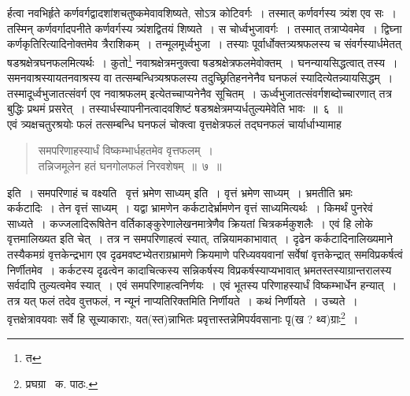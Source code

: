 \documentclass[11pt, openany]{book}
\begin{document}
\noindent र्हत्वा नवभिर्हृते कर्णवर्गद्वादशांशचतुष्कमेवावशिष्यते, सोऽत्र कोटिवर्गः~। तस्मात् कर्णवर्गस्य त्र्यंश एव सः~। तस्मिन् कर्णवर्गादपनीते कर्णवर्गस्य त्र्यंशद्वितयं शिष्यते~। स चोर्ध्वभुजावर्गः~। तस्मात् तत्राप्येवमेव~। द्विघ्ना कर्णकृतिरित्यादिनोक्तमेव त्रैराशिकम्~। तन्मूलमूर्ध्वभुजा~। तस्याः पूर्वार्धोक्तत्र्यश्रफलस्य च संवर्गस्यार्धमेतत् षडश्रक्षेत्रघनफलमित्यर्थः~। कुतो\renewcommand{\thefootnote}{१}\footnote{त} 
नवाश्रक्षेत्रमनुक्त्वा षडश्रक्षेत्रफलमेवोक्तम्~। घनन्यायसिद्धत्वात् तस्य~। समनवाश्रस्यायतनवाश्रस्य वा तत्सम्बन्धित्र्यश्रफलस्य तदुच्छ्रितिहननेनैव घनफलं स्यादित्येतन्न्यायसिद्धम्~। तस्मादूर्ध्वभुजातत्संवर्ग एव नवाश्रफलम् इत्येतच्चाप्यनेनैव सूचितम्~। ऊर्ध्वभुजातत्संवर्गशब्दोच्चारणात् तत्र बुद्धिः प्रथमं प्रसरेत्~। तस्यार्धस्यापनीनत्वादवशिष्टं षडश्रक्षेत्रमप्यर्धतुल्यमेवेति भावः~॥~६~॥ \\

एवं त्र्यक्षचतुरश्रयोः फलं तत्सम्बन्धि घनफलं चोक्त्वा वृत्तक्षेत्रफलं तद्घनफलं चार्यार्धाभ्यामाह\textendash 

\begin{quote}
{\ab समपरिणाहस्यार्धं विष्कम्भार्धहतमेव वृत्तफलम्~।\\
तन्निजमूलेन हतं घनगोलफलं निरवशेषम्~॥~७~॥}
\end{quote}

इति~। समपरिणाहं च वक्ष्यति \textendash\ {\qt वृत्तं भ्रमेण साध्यम्} इति~। वृत्तं भ्रमेण साध्यम्~। भ्रमतीति भ्रमः कर्कटादिः~। तेन वृत्तं साध्यम्~। यद्वा भ्रामणेन कर्कटादेर्भ्रामणेन वृत्तं साध्यमित्यर्थः~। किमर्थं पुनरेवं साध्यते~। कज्जलादिरूषितेन वर्तिकाङ्कुरेणालेखनमात्रेणैव क्रियतां चित्रकर्मकुशलैः~। एवं हि लोके वृत्तमालिख्यत इति चेत्~। तत्र न समपरिणाहत्वं स्यात्, तन्नियामकाभावात्~। दृढेन कर्कटादिनालिख्यमाने तस्यैकमग्रं वृत्तकेन्द्रभाग एव दृढमवष्टभ्येतराग्रभ्रामणे क्रियमाणे परिध्यवयवानां
सर्वेषां वृत्तकेन्द्रात् समविप्रकर्षत्वं निर्णीतमेव~। कर्कटस्य दृढत्वेन कादाचित्कस्य सन्निकर्षस्य विप्रकर्षस्याप्यभावात् भ्रमतस्तस्याग्रान्तरालस्य सर्वदापि तुल्यत्वमेव स्यात्~। एवं समपरिणाहत्वनिर्णयः~। एवं भूतस्य परिणाहस्यार्धं विष्कम्भार्धेन हन्यात्~। तत्र यत् फलं तदेव वुत्तफलं, न न्यूनं नाप्यतिरिक्तमिति निर्णीयते~। कथं निर्णीयते~। उच्यते~। वृत्तक्षेत्रावयवाः सर्वे हि सूच्याकाराः, यत(स्त)न्नाभितः प्रवृत्तास्तन्नेमिपर्यवसानाः पृ(ख ? थ्व)ग्राः\renewcommand{\thefootnote}{२}\footnote{प्रघग्रा \textendash\ क. पाठः.}~।


\newpage
\end{document}
